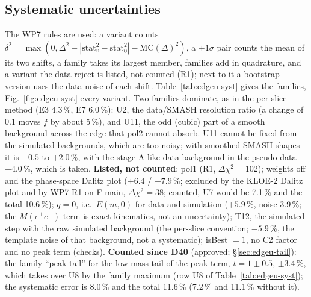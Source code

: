 \documentclass[11pt,a4paper]{article}
\newcommand{\Mee}{\ensuremath{M(e^{+}e^{-})}\xspace}
\newcommand{\code}[1]{\texttt{\detokenize{#1}}}
\newcommand{\tabin}[1]{}
\begin{document}
\subsection{Systematic uncertainties}
\label{sec:edgeu-syst}
The WP7 rules are used: a variant counts $\delta^2=\max(0,\Delta^2-|\mathrm{stat}_v^2-\mathrm{stat}_0^2|-\mathrm{MC}(\Delta)^2)$, a $\pm1\sigma$ pair
counts the mean of its two shifts, a family takes its largest member, families add in quadrature, and a variant the data reject is listed, not
counted (R1); next to it a bootstrap version uses the data noise of each shift. Table~\ref{tab:edgeu-syst} gives the families, Fig.~\ref{fig:edgeu-syst}
every variant. Two families dominate, as in the per-slice method (E3 4.3\,\%, E7 6.0\,\%): U2, the data/SMASH resolution ratio (a change of 0.1
moves $f$ by about 5\,\%), and U11, the odd (cubic) part of a smooth background across the edge that pol2 cannot absorb. U11 cannot be fixed from
the simulated backgrounds, which are too noisy; with smoothed SMASH shapes it is $-0.5$ to $+2.0$\,\%, with the stage-A-like data background in
the pseudo-data $+4.0$\,\%, which is taken. \textbf{Listed, not counted}: pol1 (R1, $\Delta\chi^2=102$); weights off and the phase-space Dalitz
plot ($+6.4$ / $+7.9$\,\%; excluded by the KLOE-2 Dalitz plot and by WP7 R1 on F-main, $\Delta\chi^2=38$; counted, U7 would be 7.1\,\% and the
total 10.6\,\%); $q=0$, i.e.\ $E(m,0)$ for data and simulation ($+5.9$\,\%, noise 3.9\,\%; the \Mee term is exact kinematics, not an uncertainty);
T12, the simulated step with the raw simulated background (the per-slice convention; $-5.9$\,\%, the template noise of that background, not a
systematic); isBest $=1$, no C2 factor and no peak term (checks). \textbf{Counted since D40} (approved; \S\ref{sec:edgeu-tail}): the family
``peak tail'' for the low-mass tail of the peak term, $t=1\pm0.5$, $\pm3.4$\,\%, which takes over U8 by the family maximum (row U8 of
Table~\ref{tab:edgeu-syst}); the systematic error is 8.0\,\% and the total 11.6\,\% (7.2\,\% and 11.1\,\% without it).

\begin{table}[!tbp]
\centering
\caption{\textbf{What it shows: the systematic error of $f_\eta(u\text{-edge})$ is 8.0\,\%, mostly the resolution ratio, the step that a smooth
background projects onto the edge and the low-mass tail of the peak.} Families U1--U11 of $f_\eta(u\text{-edge})$, per cent; ``literal'': the WP7 rule with the replica noise of
each shift; ``bootstrap'': with the data noise of each shift from the same 200 bootstrap copies. U8 contains the peak-tail family of D40 ($t=1\pm0.5$, merged by the
family maximum); U10 is the $\pm0.004$ model allowance of the per-count C2 weights (D38; $\pm0.024$ with the constant factor of D35). Source:
\code{tables_all/edgeu_syst_v3.txt} (every variant rerun with its own per-count C2 weights).}
\label{tab:edgeu-syst}
\footnotesize
\resizebox{\textwidth}{!}{\tabin{edgeu_syst_v3_cnt.tex}}
\end{table}
\end{document}
